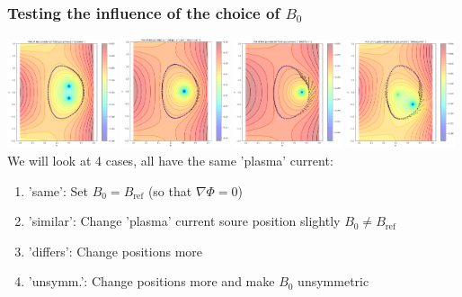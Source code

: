 \documentclass[aspectratio=169]{beamer}
\begin{document}
\begin{frame}
 \frametitle{Testing the influence of the choice of $B_0$}
 \includegraphics[width=0.24\textwidth]{pics/B0_same.png}
 \includegraphics[width=0.24\textwidth]{pics/B0_similar.png}
 \includegraphics[width=0.24\textwidth]{pics/B0_differs.png}
 \includegraphics[width=0.24\textwidth]{pics/B0_unsymm.png}\\
 We will look at 4 cases, all have the same 'plasma' current: 
 \begin{enumerate}
  \item 'same': Set $B_0=B_\text{ref}$ (so that $\nabla \Phi=0$)
  \item 'similar': Change 'plasma' current soure position slightly $B_0\neq B_\text{ref}$
  \item 'differs': Change positions more
  \item 'unsymm.': Change positions more and make $B_0$ unsymmetric
 \end{enumerate}

\end{frame}
\end{document}
